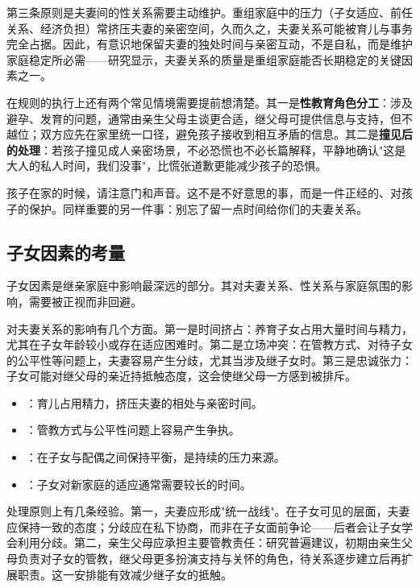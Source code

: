 第三条原则是夫妻间的性关系需要主动维护。重组家庭中的压力（子女适应、前任关系、经济负担）常挤压夫妻的亲密空间，久而久之，夫妻关系可能被育儿与事务完全占据。因此，有意识地保留夫妻的独处时间与亲密互动，不是自私，而是维护家庭稳定所必需——研究显示，夫妻关系的质量是重组家庭能否长期稳定的关键因素之一。

在规则的执行上还有两个常见情境需要提前想清楚。其一是\textbf{性教育角色分工}：涉及避孕、发育的问题，通常由亲生父母主谈更合适，继父母可提供信息与支持，但不越位；双方应先在家里统一口径，避免孩子接收到相互矛盾的信息。其二是\textbf{撞见后的处理}：若孩子撞见成人亲密场景，不必恐慌也不必长篇解释，平静地确认"这是大人的私人时间，我们没事"，比慌张道歉更能减少孩子的恐惧。

\begin{tcolorbox}[colback=pink!5!white,colframe=red!50!black,title=贴心小叮咛]
孩子在家的时候，请注意门和声音。这不是不好意思的事，而是一件正经的、对孩子的保护。同样重要的另一件事：别忘了留一点时间给你们的夫妻关系。
\end{tcolorbox}
\subsection{子女因素的考量}

子女因素是继亲家庭中影响最深远的部分。其对夫妻关系、性关系与家庭氛围的影响，需要被正视而非回避。

对夫妻关系的影响有几个方面。第一是时间挤占：养育子女占用大量时间与精力，尤其在子女年龄较小或存在适应困难时。第二是立场冲突：在管教方式、对待子女的公平性等问题上，夫妻容易产生分歧，尤其当涉及继子女时。第三是忠诚张力：子女可能对继父母的亲近持抵触态度，这会使继父母一方感到被排斥。

\begin{itemize}
  \item {}：育儿占用精力，挤压夫妻的相处与亲密时间。
  \item {}：管教方式与公平性问题上容易产生争执。
  \item {}：在子女与配偶之间保持平衡，是持续的压力来源。
  \item {}：子女对新家庭的适应通常需要较长的时间。
\end{itemize}

处理原则上有几条经验。第一，夫妻应形成"统一战线"。在子女可见的层面，夫妻应保持一致的态度；分歧应在私下协商，而非在子女面前争论——后者会让子女学会利用分歧。第二，亲生父母应承担主要管教责任：研究普遍建议，初期由亲生父母负责对子女的管教，继父母更多扮演支持与关怀的角色，待关系逐步建立后再扩展职责。这一安排能有效减少继子女的抵触。


